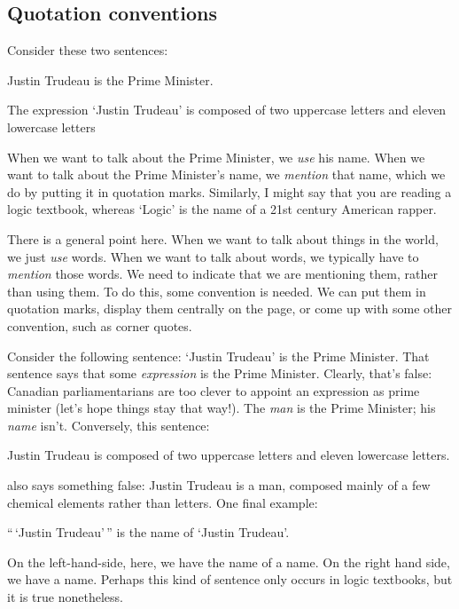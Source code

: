\subsection{Quotation conventions}
\label{sec:quotation}
Consider these two sentences:
	\begin{ebullet}
		\item Justin Trudeau is the Prime Minister.
		\item The expression `Justin Trudeau' is composed of two uppercase letters and eleven lowercase letters
	\end{ebullet}
When we want to talk about the Prime Minister, we \emph{use} his name. When we want to talk about the Prime Minister's name, we \emph{mention} that name, which we do by putting it in quotation marks. Similarly, I might say that you are reading a logic textbook, whereas `Logic' is the name of a 21st century American rapper. 

There is a general point here. When we want to talk about things in the world, we just \emph{use} words. When we want to talk about words, we typically have to \emph{mention} those words. We need to indicate that we are mentioning them, rather than using them. To do this, some convention is needed. We can put them in quotation marks, display them centrally on the page, or come up with some other convention, such as corner quotes. 

Consider the following sentence: `Justin Trudeau' is the Prime Minister. That sentence says that some \emph{expression} is the Prime Minister. Clearly, that's false: Canadian parliamentarians are too clever to appoint an expression as prime minister (let's hope things stay that way!). The \emph{man} is the Prime Minister; his \emph{name} isn't. Conversely, this sentence:
	\begin{ebullet}
		\item Justin Trudeau is composed of two uppercase letters and eleven lowercase letters.
	\end{ebullet}
also says something false: Justin Trudeau is a man, composed mainly of a few chemical elements rather than letters. One final example:
	\begin{ebullet}
		\item ``\,`Justin Trudeau'\,'' is the name of `Justin Trudeau'.
	\end{ebullet} 
On the left-hand-side, here, we have the name of a name. On the right hand side, we have a name. Perhaps this kind of sentence only occurs in logic textbooks, but it is true nonetheless.

